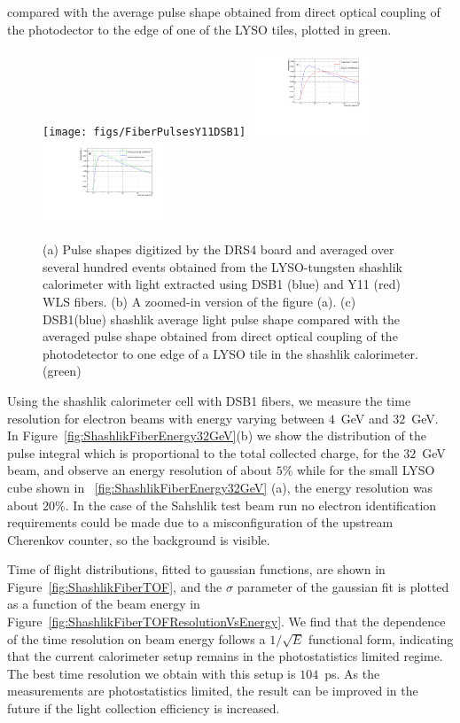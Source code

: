 \documentclass[12pt]{article}
\begin{document}
compared with the average pulse shape
obtained from direct optical coupling of the photodector to the edge of one of
the LYSO tiles, plotted in green. 


\begin{figure}[H] \centering
\texttt{[image: figs/FiberPulsesY11DSB1]} 
\includegraphics[width=0.32\textwidth]{figs/FiberPulsesZoomY11DSB1} 
\includegraphics[width=0.32\textwidth]{figs/FiberPulsesZoomDirectDSB1} 
\caption{\small (a) Pulse shapes digitized by the DRS4 board and averaged over several hundred events 
obtained from the LYSO-tungsten shashlik calorimeter with light extracted using
DSB1 (blue) and Y11 (red) WLS fibers. 
(b) A zoomed-in version of the figure (a). (c)  DSB1(blue) shashlik average light pulse shape compared with 
the averaged pulse shape obtained from direct optical coupling of the photodetector to one edge of  a LYSO tile in the shashlik calorimeter.  (green)} 
\label{fig:FiberPulseComparison}
\end{figure}


Using the shashlik calorimeter cell with DSB1 fibers, we measure the time resolution
for electron beams with energy varying between $4$~GeV and $32$~GeV.
In Figure~\ref{fig:ShashlikFiberEnergy32GeV}(b) we show the distribution
of the pulse integral which is proportional to the total collected charge,
for the $32$~GeV beam, and observe an energy resolution of about $5\%$
while for the small LYSO cube shown in ~\ref{fig:ShashlikFiberEnergy32GeV} (a),  the energy resolution was about 20\%. 
In the case of the Sahshlik test beam run no electron identification requirements
could be made due to a misconfiguration of the upstream Cherenkov counter, so the background is visible.


Time of flight distributions, fitted to gaussian functions,
are shown in Figure~\ref{fig:ShashlikFiberTOF}, and the 
$\sigma$ parameter of the gaussian fit is plotted as a function of the
beam energy in Figure~\ref{fig:ShashlikFiberTOFResolutionVsEnergy}.
We find that the dependence of the time resolution on
beam energy follows a $1/\sqrt{E}$ functional form, indicating
that the current calorimeter setup remains in the photostatistics
limited regime. The best time resolution we obtain
with this setup is $104$~ps. As the measurements are photostatistics
limited, the result can be improved in the future if the light collection
efficiency is increased.
\end{document}
